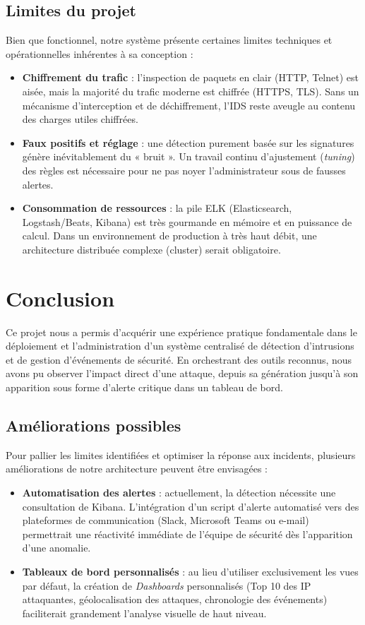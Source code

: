 \documentclass[12pt]{article}
\begin{document}
\subsection{Limites du projet}
Bien que fonctionnel, notre système présente certaines limites techniques et opérationnelles inhérentes à sa conception :
\begin{itemize}[nosep]
    \item \textbf{Chiffrement du trafic} : l'inspection de paquets en clair (HTTP, Telnet) est aisée, mais la majorité du trafic moderne est chiffrée (HTTPS, TLS). Sans un mécanisme d'interception et de déchiffrement, l'IDS reste aveugle au contenu des charges utiles chiffrées.
    \item \textbf{Faux positifs et réglage} : une détection purement basée sur les signatures génère inévitablement du « bruit ». Un travail continu d'ajustement (\textit{tuning}) des règles est nécessaire pour ne pas noyer l'administrateur sous de fausses alertes.
    \item \textbf{Consommation de ressources} : la pile ELK (Elasticsearch, Logstash/Beats, Kibana) est très gourmande en mémoire et en puissance de calcul. Dans un environnement de production à très haut débit, une architecture distribuée complexe (cluster) serait obligatoire.
\end{itemize}


\section{Conclusion}\label{sec:Q9}

Ce projet nous a permis d'acquérir une expérience pratique fondamentale dans le déploiement et l'administration d'un système centralisé de détection d'intrusions et de gestion d'événements de sécurité. En orchestrant des outils reconnus, nous avons pu observer l'impact direct d'une attaque, depuis sa génération jusqu'à son apparition sous forme d'alerte critique dans un tableau de bord.

\subsection{Améliorations possibles}
Pour pallier les limites identifiées et optimiser la réponse aux incidents, plusieurs améliorations de notre architecture peuvent être envisagées :
\begin{itemize}[nosep]
    \item \textbf{Automatisation des alertes} : actuellement, la détection nécessite une consultation de Kibana. L'intégration d'un script d'alerte automatisé vers des plateformes de communication (Slack, Microsoft Teams ou e-mail) permettrait une réactivité immédiate de l'équipe de sécurité dès l'apparition d'une anomalie.
    \item \textbf{Tableaux de bord personnalisés} : au lieu d'utiliser exclusivement les vues par défaut, la création de \textit{Dashboards} personnalisés (Top 10 des IP attaquantes, géolocalisation des attaques, chronologie des événements) faciliterait grandement l'analyse visuelle de haut niveau.
\end{itemize}
\end{document}

